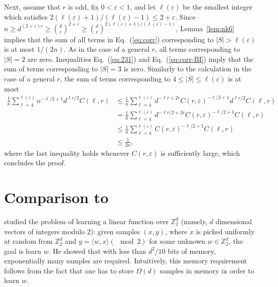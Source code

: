 \documentclass[final, 12pt]{colt2018}
\renewcommand{\eqref}[1]{Eq.~(\ref{#1})}
\begin{document}
Next, assume that $r$ is odd, fix $0 < \varepsilon < 1$, and let $\ell(\varepsilon)$ be the smallest integer which satisfies $2(\ell(\varepsilon)+1)/(\ell(\varepsilon)-1) \le 2+\varepsilon$. Since
$n \ge d^{(2+\varepsilon)r} \ge \binom{d}{r}^{2+\varepsilon} \ge \binom{d}{r}^{2 (\ell(\varepsilon)+1)/(\ell(\varepsilon)-1)}$, Lemma~\ref{lem:nk6} implies that the sum of all terms in \eqref{eq:corr} corresponding to $\lvert S \rvert > \ell(\varepsilon)$ is at most $1/(2n)$. As in the case of a general $r$, all terms corresponding to $\lvert S \rvert = 2$ are zero. Inequalities \eqref{eq:231} and \eqref{eq:corr-BI} imply that the sum of terms corresponding to $\lvert S \rvert = 3$ is zero. Similarly to the calculation in the case of a general $r$, the sum of terms corresponding to $4 \le \lvert S \rvert \le \ell(\varepsilon)$ is at most
\begin{align*}
\frac{1}{n} \sum_{\ell=4}^{\ell(\varepsilon)} n^{-\ell/2+1} d^{\ell r/2} C(\ell,r)
&\le \frac{1}{n} \sum_{\ell=4}^{\ell(\varepsilon)} d^{-\ell r + 2 r} C(r, \varepsilon)^{-\ell /2 +1} d^{\ell r/2} C(\ell,r) \\
&= \frac{1}{n} \sum_{\ell=4}^{\ell(\varepsilon)} d^{-\ell r/2 + 2 r} C(r, \varepsilon)^{-\ell /2 +1} C(\ell,r) \\
&\le \frac{1}{n} \sum_{\ell=4}^{\ell(\varepsilon)} C(r, \varepsilon)^{-\ell /2 +1} C(\ell,r) \\
&\le \frac{1}{2n},
\end{align*}
where the last inequality holds whenever $C(r, \varepsilon)$ is sufficiently large, which concludes the proof.

\section{Comparison to \cite{raz2016fast}} \label{sec:raz-compare}

\cite{raz2016fast} studied the problem of learning a linear function over $\mathbb{Z}_2^d$ (namely, $d$ dimensional vectors of integers modulo $2$): given samples $\left(x, y\right)$, where $x$ is picked uniformly at random from $\mathbb{Z}_2^d$ and $y = \langle w,x\rangle (\mod 2)$ for some unknown $w \in \mathbb{Z}_2^d$, the goal is learn $w$. He showed that with less than $d^2/10$ bits of memory, exponentially many samples are required. Intuitively, this memory requirement follows from the fact that one has to store $\Omega(d)$ samples in memory in order to learn $w$.
\end{document}
